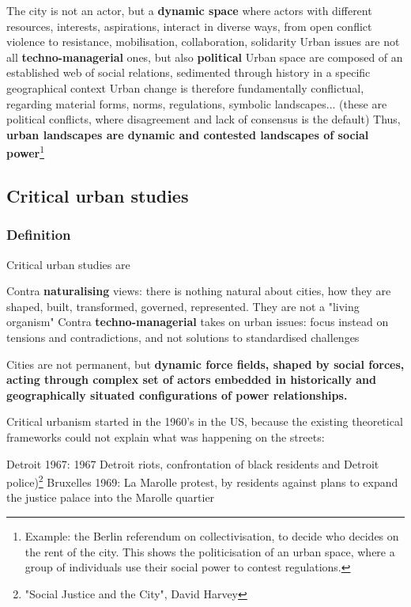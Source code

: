 \documentclass{article}
\begin{document}
\begin{outline}
	\1 The city is not an actor, but a \textbf{dynamic space} where actors with different resources, interests, aspirations, interact in diverse ways, from open conflict violence to resistance, mobilisation, collaboration, solidarity
	\1 Urban issues are not all \textbf{techno-managerial} ones, but also \textbf{political}
		\2 Urban space are composed of an established web of social relations, sedimented through history in a specific geographical context
		\2 Urban change is therefore fundamentally conflictual, regarding material forms, norms, regulations, symbolic landscapes... (these are political conflicts, where disagreement and lack of consensus is the default)
		\2 Thus, \textbf{urban landscapes are dynamic and contested landscapes of social power}\footnote{Example: the Berlin referendum on collectivisation, to decide who decides on the rent of the city. This shows the politicisation of an urban space, where a group of individuals use their social power to contest regulations.}
\end{outline}

\subsection{Critical urban studies}

\subsubsection{Definition}

Critical urban studies are
\begin{outline}
	\1 Contra \textbf{naturalising} views: there is nothing natural about cities, how they are shaped, built, transformed, governed, represented. They are not a "living organism"
	\1 Contra \textbf{techno-managerial} takes on urban issues: focus instead on tensions and contradictions, and not solutions to standardised challenges
\end{outline}

Cities are not permanent, but \textbf{dynamic force fields, shaped by social forces, acting through complex set of actors embedded in historically and geographically situated configurations of power relationships.}

Critical urbanism started in the 1960's in the US, because the existing theoretical frameworks could not explain what was happening on the streets:

\begin{outline} 
	\1 Detroit 1967: 1967 Detroit riots, confrontation of black residents and Detroit police)\footnote{"Social Justice and the City", David Harvey} 
	\1 Bruxelles 1969: La Marolle protest, by residents against plans to expand the justice palace into the Marolle quartier 
\end{outline}
\end{document}
